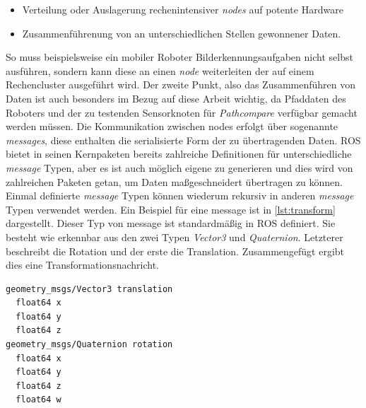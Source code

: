 \begin{itemize}
  \item Verteilung oder Auslagerung rechenintensiver \textit{nodes} auf potente Hardware
  \item Zusammenführenung von an unterschiedlichen Stellen gewonnener Daten.
\end{itemize}

So muss beispielsweise ein mobiler Roboter Bilderkennungsaufgaben nicht selbst
ausführen, sondern kann diese an einen \textit{node} weiterleiten der auf einem
Rechencluster ausgeführt wird. Der zweite Punkt, also das Zusammenführen von
Daten ist auch besonders im Bezug auf diese Arbeit wichtig, da Pfaddaten des
Roboters und der zu testenden Sensorknoten für \textit{Pathcompare} verfügbar
gemacht werden müssen.  Die Kommunikation zwischen nodes erfolgt über
sogenannte \textit{messages}, diese enthalten die serialisierte Form der zu
übertragenden Daten. ROS bietet in seinen Kernpaketen bereits zahlreiche
Definitionen für unterschiedliche \textit{message} Typen, aber es ist auch
möglich eigene zu generieren und dies wird von zahlreichen Paketen getan, um
Daten maßgeschneidert übertragen zu können. Einmal definierte \textit{message}
Typen können wiederum rekursiv in anderen \textit{message} Typen verwendet
werden. Ein Beispiel für eine message ist in \autoref{lst:transform}
dargestellt. Dieser Typ von message ist standardmäßig in ROS definiert.
Sie besteht wie erkennbar aus den zwei Typen \textit{Vector3} und
\textit{Quaternion}. Letzterer beschreibt die Rotation und der erste die
Translation. Zusammengefügt ergibt dies eine Transformationsnachricht.

\begin{lstlisting}[caption=ROS transformation message, label=lst:transform]
geometry_msgs/Vector3 translation
  float64 x
  float64 y
  float64 z
geometry_msgs/Quaternion rotation
  float64 x
  float64 y
  float64 z
  float64 w
\end{lstlisting}

